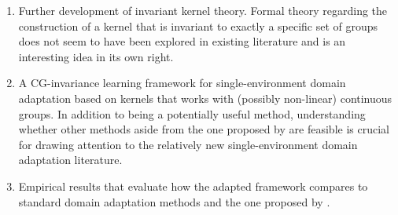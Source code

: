 \begin{enumerate}

\item
Further development of invariant kernel theory. Formal theory regarding the construction of a kernel that is invariant to exactly a specific set of groups does not seem to have been explored in existing literature and is an interesting idea in its own right.

\item
A CG-invariance learning framework for single-environment domain adaptation based on kernels that works with (possibly non-linear) continuous groups. In addition to being a potentially useful method, understanding whether other methods aside from the one proposed by \citeauthor{Mouli:2021} are feasible is crucial for drawing attention to the relatively new single-environment domain adaptation literature.

\item
Empirical results that evaluate how the adapted framework compares to standard domain adaptation methods and the one proposed by \citeauthor{Mouli:2021}.

\end{enumerate}

\iffalse
\begin{itemize}

\item
Setting: $\calY=\bbR$, $\calG_1,\ldots,\calG_m$ compact with Haar measures $\lambda_1,\ldots,\lambda_m$, $\calG_\calI\trianglelefteq\calG_{\calD\cup\calI}$

\item
Idea: adapt original algorithm to use kernel regression rather than neural networks. Instead of finding bases of eigenspaces and learning the coefficients to learn invariances, do multiple kernel regression where the kernels are invariant to actions of subsets of groups and learn the invariances by learning the weights

\item
Contributions if successful: development of invariant kernel theory (constructing kernels invariant to a specific set of groups and no more), CG-invariance learning framework that allows for potentially infinite dimensional feature space and (possibly non-linear) continuous groups

\item
Main tasks:
\begin{enumerate}
\item
Show how to construct kernels that are invariant to multiple groups and not invariant to overgroups (if possible)
\item
Formalize theory under which construction holds (analogous to Lemmas 1, 2 and Theorem 3 for original paper) or why not possible
\item
Introduce kernel-version of framework and adapt optimization objective for kernel regression (if 1 and 2 successful)
\end{enumerate}

\end{itemize}
\fi

